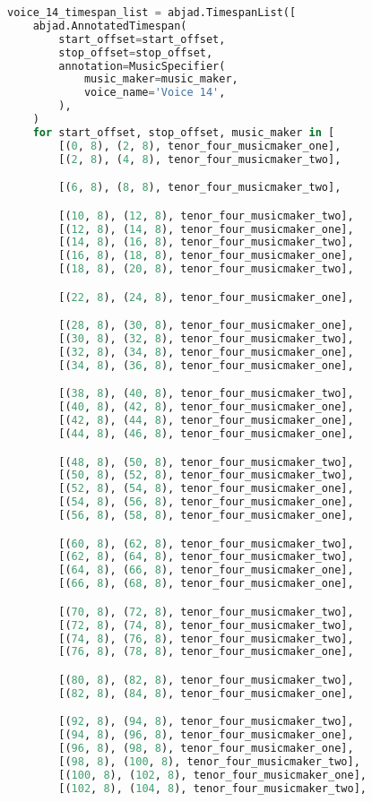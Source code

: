 \begin{lstlisting}[language=Python, caption=Invocation Source Code]
voice_14_timespan_list = abjad.TimespanList([
    abjad.AnnotatedTimespan(
        start_offset=start_offset,
        stop_offset=stop_offset,
        annotation=MusicSpecifier(
            music_maker=music_maker,
            voice_name='Voice 14',
        ),
    )
    for start_offset, stop_offset, music_maker in [
        [(0, 8), (2, 8), tenor_four_musicmaker_one],
        [(2, 8), (4, 8), tenor_four_musicmaker_two],

        [(6, 8), (8, 8), tenor_four_musicmaker_two],

        [(10, 8), (12, 8), tenor_four_musicmaker_two],
        [(12, 8), (14, 8), tenor_four_musicmaker_one],
        [(14, 8), (16, 8), tenor_four_musicmaker_two],
        [(16, 8), (18, 8), tenor_four_musicmaker_one],
        [(18, 8), (20, 8), tenor_four_musicmaker_two],

        [(22, 8), (24, 8), tenor_four_musicmaker_one],

        [(28, 8), (30, 8), tenor_four_musicmaker_one],
        [(30, 8), (32, 8), tenor_four_musicmaker_two],
        [(32, 8), (34, 8), tenor_four_musicmaker_one],
        [(34, 8), (36, 8), tenor_four_musicmaker_one],

        [(38, 8), (40, 8), tenor_four_musicmaker_two],
        [(40, 8), (42, 8), tenor_four_musicmaker_one],
        [(42, 8), (44, 8), tenor_four_musicmaker_one],
        [(44, 8), (46, 8), tenor_four_musicmaker_one],

        [(48, 8), (50, 8), tenor_four_musicmaker_two],
        [(50, 8), (52, 8), tenor_four_musicmaker_two],
        [(52, 8), (54, 8), tenor_four_musicmaker_one],
        [(54, 8), (56, 8), tenor_four_musicmaker_one],
        [(56, 8), (58, 8), tenor_four_musicmaker_one],

        [(60, 8), (62, 8), tenor_four_musicmaker_two],
        [(62, 8), (64, 8), tenor_four_musicmaker_two],
        [(64, 8), (66, 8), tenor_four_musicmaker_one],
        [(66, 8), (68, 8), tenor_four_musicmaker_one],

        [(70, 8), (72, 8), tenor_four_musicmaker_two],
        [(72, 8), (74, 8), tenor_four_musicmaker_two],
        [(74, 8), (76, 8), tenor_four_musicmaker_two],
        [(76, 8), (78, 8), tenor_four_musicmaker_one],

        [(80, 8), (82, 8), tenor_four_musicmaker_two],
        [(82, 8), (84, 8), tenor_four_musicmaker_one],

        [(92, 8), (94, 8), tenor_four_musicmaker_two],
        [(94, 8), (96, 8), tenor_four_musicmaker_one],
        [(96, 8), (98, 8), tenor_four_musicmaker_one],
        [(98, 8), (100, 8), tenor_four_musicmaker_two],
        [(100, 8), (102, 8), tenor_four_musicmaker_one],
        [(102, 8), (104, 8), tenor_four_musicmaker_two],


\end{lstlisting}

